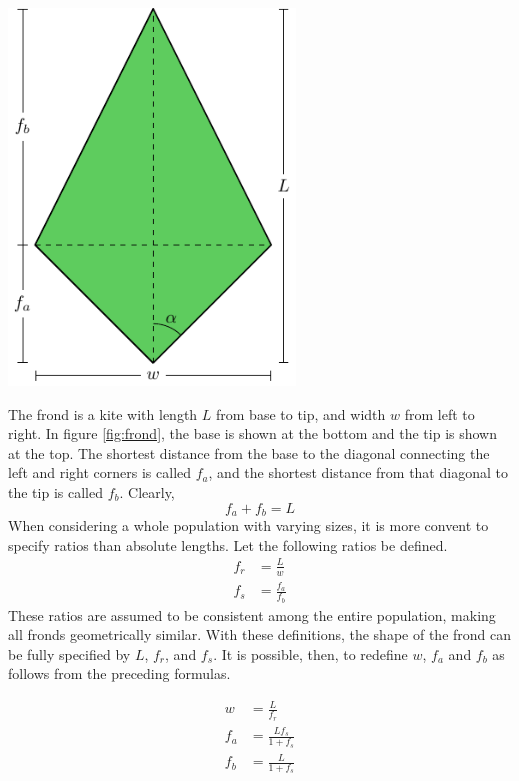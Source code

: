 \documentclass[10pt]{article}
\newenvironment{mcfig}
	{\par\medskip\noindent\minipage{\linewidth}}
	{\endminipage\par\medskip}
\begin{document}
\begin{multicols}{2}
\begin{mcfig}
	\centering
	\includegraphics[width=3in]{frond}
	\label{fig:frond}
\end{mcfig}

The frond is a kite with length $L$ from base to tip, and width $w$ from left to right.
 In figure \ref{fig:frond}, the base is shown at the bottom and the tip is shown at the top.
 The shortest distance from the base to the diagonal connecting the left and right corners is called $f_a$, and the shortest distance from that diagonal to the tip is called $f_b$.
 Clearly,
 \begin{equation}
	 f_a + f_b = L
 \end{equation}
When considering a whole population with varying sizes, it is more convent to specify ratios than absolute lengths.
Let the following ratios be defined.
\begin{align}
	f_r &= \frac{L}{w} \\
	f_s &= \frac{f_a}{f_b}
\end{align}
These ratios are assumed to be consistent among the entire population, making all fronds geometrically similar.
With these definitions, the shape of the frond can be fully specified by $L$, $f_r$, and $f_s$.
It is possible, then, to redefine $w$, $f_a$ and $f_b$ as follows from the preceding formulas.

\begin{align}
	w &= \frac{L}{f_r} \\
	f_a &= \frac{Lf_s}{1+f_s} \\
	f_b &= \frac{L}{1+f_s}
\end{align}


\end{multicols}
\end{document}
